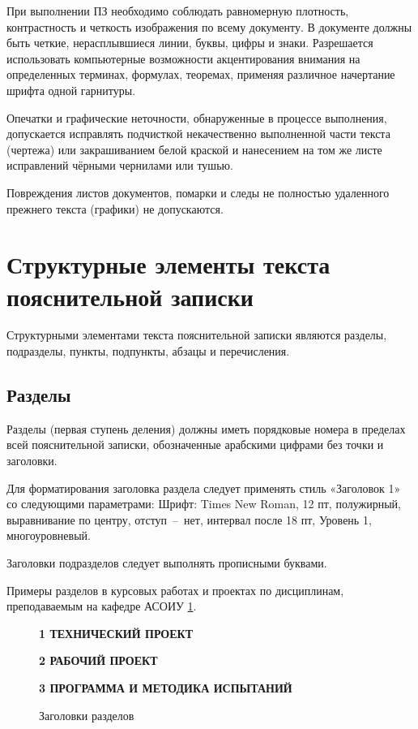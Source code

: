При выполнении ПЗ необходимо соблюдать равномерную плотность, контрастность и
четкость изображения по всему документу. В документе должны быть четкие, нерасплывшиеся
линии, буквы, цифры и знаки. Разрешается использовать компьютерные возможности
акцентирования внимания на определенных терминах, формулах, теоремах, применяя
различное начертание шрифта одной гарнитуры.

Опечатки и графические неточности, обнаруженные в процессе выполнения, допускается
исправлять подчисткой некачественно выполненной части текста (чертежа) или закрашиванием
белой краской и нанесением на том же листе исправлений чёрными чернилами или тушью.

Повреждения листов документов, помарки и следы не полностью удаленного прежнего
текста (графики) не допускаются.

\section{Структурные элементы текста пояснительной записки}

Структурными элементами текста пояснительной записки являются разделы,
подразделы, пункты, подпункты, абзацы и перечисления.

\subsection{Разделы}

Разделы (первая ступень деления) должны иметь порядковые номера в пределах всей
пояснительной записки, обозначенные арабскими цифрами без точки и заголовки.

Для форматирования заголовка раздела следует применять стиль «Заголовок 1» со
следующими параметрами: Шрифт: Times New Roman, 12 пт, полужирный, выравнивание по
центру, отступ~--~нет, интервал после 18 пт, Уровень 1, многоуровневый.

Заголовки подразделов следует выполнять прописными буквами.

Примеры разделов в курсовых работах и проектах по дисциплинам, преподаваемым на
кафедре АСОИУ \ref{headers}.

\begin{figure}[h]
	\begin{framed}
		\centerline{\bf\uppercase{1 Технический проект}}
		\centerline{\bf\uppercase{2 Рабочий проект}}
		\centerline{\bf\uppercase{3 Программа и методика испытаний}}
	\end{framed}
	\caption{Заголовки разделов}
	\label{headers}
\end{figure}

